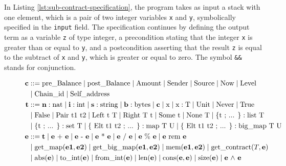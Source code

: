 \documentclass[runningheads]{llncs}
\begin{document}
In Listing \ref{lst:sub-contract-specification}, the program takes as input a stack with one
element, which is a pair of two integer variables \lstinline/x/ and \lstinline/y/, symbolically specified in the \lstinline|input| field. 
The specification continues by defining the output term as a variable
\lstinline/z/ of type integer, a precondition stating
that the integer \lstinline/x/ is greater than or equal to
\lstinline/y/, and a postcondition asserting that the result
\lstinline/z/ is equal to the subtract of
\lstinline/x/ and \lstinline/y/, which is greater or equal to
zero. The symbol \lstinline/&&/ stands for conjunction. 
\begin{figure}[tp]
\begin{align*}
\textbf{c} & ::= 
    \text{pre\_Balance}
   \Mid \text{post\_Balance}
   \Mid \text{Amount}
   \Mid \text{Sender}
   \Mid \text{Source} 
   \Mid \text{Now}
   \Mid \text{Level} \\
   &\Mid \text{Chain\_id}
   \Mid \text{Self\_address}\\
\textbf{t} &::= 
   \textbf{n}: \text{nat}
   \Mid \textbf{i}: \text{int}
   \Mid  \textbf{s}: \text{string} 
   \Mid  \textbf{b}: \text{bytes}
   \Mid  \textbf{c}  
   \Mid  \text{x} 
   \Mid \text{x}: \text{T} 
   \Mid \UNIT 
   \Mid \NEVER 
   \Mid \TRUE \\
   &\Mid \FALSE 
   \Mid \PAIR\ \text{t1 t2}
   \Mid \LEFT\ \text{t}\  \text{T}
   \Mid \RIGHT\ \text{T}\ \text{t}
   \Mid \SOME\ \text{t}
   \Mid \NONE\ \text{T} 
   \Mid \text{\{t ; ... \}}: \text{list T} \\
   &\Mid \text{\{t ; ... \}}: \text{set T} 
   \Mid \text{\{ Elt t1 t2 ; ... \}}: \text{map T U}
   \Mid \text{\{ Elt t1 t2 ; ... \}}: \text{big\_map T U} \\
\textbf{e} & :: = \textbf{t}  \Mid \textbf{e} \text{ + } \textbf{e}\Mid \textbf{e} \text{ - } \textbf{e}  \Mid \textbf{e} \text{ * } \textbf{e} \Mid \textbf{e} \text{ / } \textbf{e} \Mid \textbf{e} \text{ \% } \textbf{e} \Mid \textbf{e} \text{ rem } \textbf{e} \\
& 
 \Mid \text{get\_map} (\textbf{e1}, \textbf{e2}) 
 \Mid \text{get\_big\_map} (\textbf{e1}, \textbf{e2})  
 \Mid \text{mem} (\textbf{e1}, \textbf{e2})  
 \Mid \text{get\_contract} (T, \textbf{e})    \\
& \Mid \text{abs} (\textbf{e})  
 \Mid \text{to\_int} (\textbf{e})  
 \Mid \text{from\_int} (\textbf{e})  
 \Mid \text{len} (\textbf{e})
 \Mid \text{cons} (\textbf{e}, \textbf{e})
 \Mid \text{size} (\textbf{e})
\Mid \textbf{e} \text{ $\wedge$ } \textbf{e}  \\

\end{align*}
\end{figure}
\end{document}
